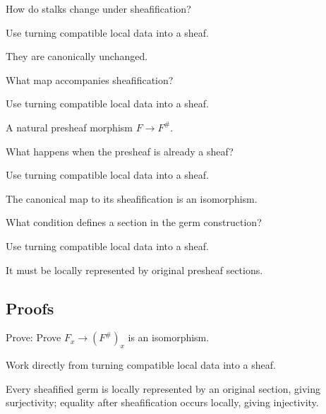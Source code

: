 \begin{exercise}[Stalks]\label{exr:vi14-expand-02}
How do stalks change under sheafification?
\end{exercise}
\begin{hint}
Use turning compatible local data into a sheaf.
\end{hint}
\begin{solution}
They are canonically unchanged.
\end{solution}

\begin{exercise}\label{exr:vi14-expand-03}
What map accompanies sheafification?
\end{exercise}
\begin{hint}
Use turning compatible local data into a sheaf.
\end{hint}
\begin{solution}
A natural presheaf morphism $F\to F^\#$.
\end{solution}

\begin{exercise}\label{exr:vi14-expand-04}
What happens when the presheaf is already a sheaf?
\end{exercise}
\begin{hint}
Use turning compatible local data into a sheaf.
\end{hint}
\begin{solution}
The canonical map to its sheafification is an isomorphism.
\end{solution}

\begin{exercise}\label{exr:vi14-expand-05}
What condition defines a section in the germ construction?
\end{exercise}
\begin{hint}
Use turning compatible local data into a sheaf.
\end{hint}
\begin{solution}
It must be locally represented by original presheaf sections.
\end{solution}

\subsection*{Proofs}

\begin{exercise}\label{exr:vi14-expand-06}
Prove: Prove $F_x\to(F^\#)_x$ is an isomorphism.
\end{exercise}
\begin{hint}
Work directly from turning compatible local data into a sheaf.
\end{hint}
\begin{solution}
Every sheafified germ is locally represented by an original section, giving surjectivity; equality after sheafification occurs locally, giving injectivity.
\end{solution}

